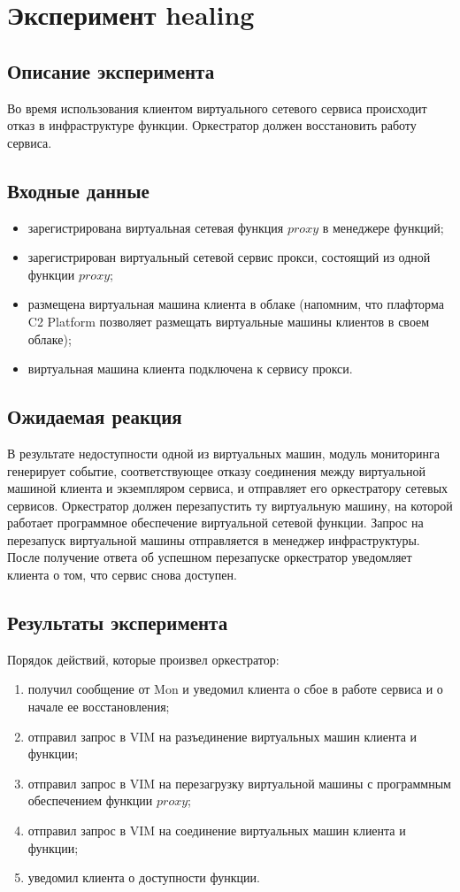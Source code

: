 \documentclass[oneside,final,14pt,a4paper]{extreport}
\begin{document}
\section{Эксперимент healing}
\subsection{Описание эксперимента}
Во время использования клиентом виртуального сетевого сервиса происходит отказ в инфраструктуре функции. Оркестратор должен восстановить работу сервиса.

\subsection{Входные данные}
\begin{itemize}
	\item зарегистрирована виртуальная сетевая функция $proxy$ в менеджере функций;
	\item зарегистрирован виртуальный сетевой сервис прокси, состоящий из одной функции $proxy$;
	\item размещена виртуальная машина клиента в облаке (напомним, что плафторма C2 Platform позволяет размещать виртуальные машины клиентов в своем облаке);
	\item виртуальная машина клиента подключена к сервису прокси.
\end{itemize}

\subsection{Ожидаемая реакция}
В результате недоступности одной из виртуальных машин, модуль мониторинга генерирует событие, соответствующее отказу соединения между виртуальной машиной клиента и экземпляром сервиса, и отправляет его оркестратору сетевых сервисов. Оркестратор должен перезапустить ту виртуальную машину, на которой работает программное обеспечение виртуальной сетевой функции. Запрос на перезапуск виртуальной машины отправляется в менеджер инфраструктуры. После получение ответа об успешном перезапуске оркестратор уведомляет клиента о том, что сервис снова доступен.

\subsection{Результаты эксперимента}
Порядок действий, которые произвел оркестратор:
\begin{enumerate}
	\item получил сообщение от Mon и уведомил клиента о сбое в работе сервиса и о начале ее восстановления;
	\item отправил запрос в VIM на разъединение виртуальных машин клиента и функции;
	\item отправил запрос в VIM на перезагрузку виртуальной машины с программным обеспечением функции $proxy$;
	\item отправил запрос в VIM на соединение виртуальных машин клиента и функции;
	\item уведомил клиента о доступности функции.
\end{enumerate}
\end{document}
